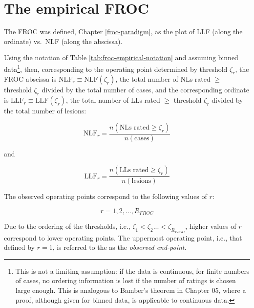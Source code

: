 \documentclass[
]{book}
\begin{document}
\hypertarget{froc-empirical-froc-plot}{%
\section{The empirical FROC}\label{froc-empirical-froc-plot}}

The FROC was defined, Chapter \ref{froc-paradigm}, as the plot of LLF (along the ordinate) vs.~NLF (along the abscissa).

Using the notation of Table \ref{tab:froc-empirical-notation} and assuming binned data\footnote{This is not a limiting assumption: if the data is continuous, for finite numbers of cases, no ordering information is lost if the number of ratings is chosen large enough. This is analogous to Bamber's theorem in Chapter 05, where a proof, although given for binned data, is applicable to continuous data.}, then, corresponding to the operating point determined by threshold \(\zeta_r\), the FROC abscissa is \(\text{NLF}_r \equiv \text{NLF}\left ( \zeta_r \right )\), the total number of NLs rated \(\geq\) threshold \(\zeta_r\) divided by the total number of cases, and the corresponding ordinate is \(\text{LLF}_r \equiv \text{LLF}\left ( \zeta_r \right )\), the total number of LLs rated \(\geq\) threshold \(\zeta_r\) divided by the total number of lesions:

\begin{equation}
\text{NLF}_r  = \frac{n\left ( \text{NLs rated} \geq \zeta_r\right )}{n\left ( \text{cases} \right )}
\label{eq:froc-empirical-NLF1}
\end{equation}

and

\begin{equation}
\text{LLF}_r  = \frac{n\left ( \text{LLs rated} \geq \zeta_r\right )}{n\left ( \text{lesions} \right )}
\label{eq:froc-empirical-LLF1}
\end{equation}

The observed operating points correspond to the following values of \(r\):

\begin{equation}
r = 1, 2, ...,R_{FROC} 
\label{eq:froc-empirical-range-r}
\end{equation}

Due to the ordering of the thresholds, i.e., \(\zeta_1 < \zeta_2 ... < \zeta_{R_{FROC}}\), higher values of \(r\) correspond to lower operating points. The uppermost operating point, i.e., that defined by \(r = 1\), is referred to the as the \emph{observed end-point}.
\end{document}

